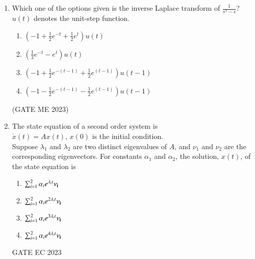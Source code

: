 \begin{enumerate}[label=\thechapter.\arabic*,ref=\thechapter.\theenumi]
\item Which one of the options given is the inverse Laplace transform of $\frac{1}{s^3-s}$?\\
$u(t)$ denotes the unit-step function.
\begin{enumerate}[label=(\Alph*)]
\item $\left(-1+\frac{1}{2}e^{-t}+\frac{1}{2}e^t\right)u(t)$\\
\item $\left(\frac{1}{3}e^{-t}-e^t\right)u(t)$\\
\item $\left(-1+\frac{1}{2}e^{-(t-1)}+\frac{1}{2}e^{(t-1)}\right)u(t-1)$\\
\item $\left(-1-\frac{1}{2}e^{-(t-1)}-\frac{1}{2}e^{(t-1)}\right)u(t-1)$\\
\end{enumerate}
\hfill(GATE ME 2023)\\
\solution

\newpage

\item The state equation of a second order system is \\
$ \dot{{x}}(t) = A{x}(t)$, \quad ${x}(0)$ is the initial condition. \\
Suppose $\lambda_1$ and $\lambda_2$ are two distinct eigenvalues of $A$, and $\nu_1$ and $\nu_2$ are the corresponding eigenvectors. For constants $\alpha_1$ and $\alpha_2$, the solution, ${x}(t)$, of the state equation is \\
\begin{enumerate}[label=(\Alph*)]
\item $\sum_{i=1}^{2} \alpha_ie^{\lambda_it}\bf{\nu}_i$
\item $\sum_{i=1}^{2} \alpha_ie^{2\lambda_it}\bf{\nu}_i$
\item $\sum_{i=1}^{2} \alpha_ie^{3\lambda_it}\bf{\nu}_i$
\item $\sum_{i=1}^{2} \alpha_ie^{4\lambda_it}\bf{\nu}_i$
\end{enumerate}
\hfill{GATE EC 2023}\\
\solution

\newpage


\end{enumerate}
